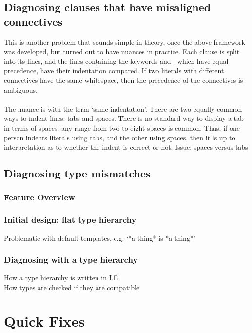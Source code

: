 \documentclass[../main.tex]{subfiles}
\begin{document}
\subsection{Diagnosing clauses that have misaligned connectives}
This is another problem that sounds simple in theory, once the above framework was developed, but turned out to have nuances in practice. Each clause is split into its lines, and the lines containing the keywords  and , which have equal precedence, have their indentation compared. If two literals with different connectives have the same whitespace, then the precedence of the connectives is ambiguous.
\\
\\
The nuance is with the term `same indentation'. There are two equally common ways to indent lines: tabs and spaces. There is no standard way to display a tab in terms of spaces: any range from two to eight spaces is common. Thus, if one person indents literals using tabs, and the other using spaces, then it is up to interpretation as to whether the indent is correct or not.
Issue: spaces versus tabs

\subsection{Diagnosing type mismatches}

\subsubsection{Feature Overview}

\subsubsection{Initial design: flat type hierarchy}
Problematic with default templates, e.g. `*a thing* is *a thing*'

\subsubsection{Diagnosing with a type hierarchy}
How a type hierarchy is written in LE
\\ 
How types are checked if they are compatible
%
%
%
\section{Quick Fixes}
\end{document}
